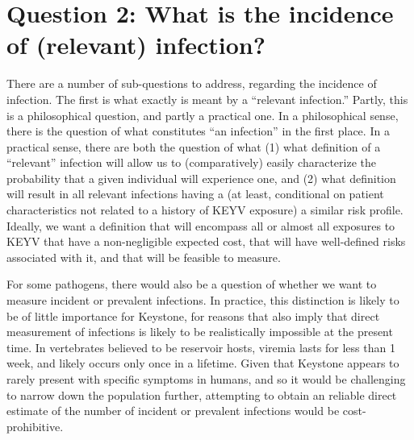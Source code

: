 \documentclass[12pt]{article}
\newcommand{\cjh}{\textcolor{blue}{cjh}}
\newcommand{\tjh}{\textcolor{red}{tjh}}
\newcommand{\msg}[3]{(#1 $\rightarrow$ #2: #3)}
\newcommand{\mtc}[1]{\msg\tjh\cjh{#1}}
\begin{document}
    \section[Incidence of infection]{Question 2: What is the incidence of (relevant) infection?}
        \label{incidence}

        There are a number of sub-questions to address, regarding the incidence of infection. The first is what exactly is meant by a ``relevant infection.'' Partly, this is a philosophical question, and partly a practical one. In a philosophical sense, there is the question of what constitutes ``an infection'' in the first place. In a practical sense, there are both the question of what (1) what definition of a ``relevant'' infection will allow us to (comparatively) easily characterize the probability that a given individual will experience one, and (2) what definition will result in all relevant infections having a (at least, conditional on patient characteristics not related to a history of KEYV exposure) a similar risk profile. Ideally, we want a definition that will encompass all or almost all exposures to KEYV that have a non-negligible expected cost, that will have well-defined risks associated with it, and that will be feasible to measure.

        For some pathogens, there would also be a question of whether we want to measure incident or prevalent infections. In practice, this distinction is likely to be of little importance for Keystone, for reasons that also imply that direct measurement of infections is likely to be realistically impossible at the present time. In vertebrates believed to be reservoir hosts, viremia lasts for less than 1 week, and likely occurs only once in a lifetime\cite{watts1988maintenance,watts1979experimental}. Given that Keystone appears to rarely present with specific symptoms in humans, and so it would be challenging to narrow down the population further, attempting to obtain an reliable direct estimate of the number of incident or prevalent infections would be cost-prohibitive.
        
\end{document}
